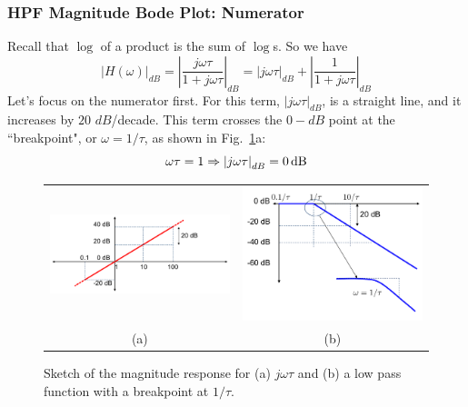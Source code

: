 \subsubsection{HPF Magnitude Bode Plot: Numerator}
Recall that $\log$ of a product is the sum of $\log$s.  So we have
    \begin{equation}
        {\left| {H(\omega )} \right|_{dB}} = {\left| {\frac{{j\omega \tau }}{{1 + j\omega \tau }}} \right|_{dB}} = {\left| {j\omega \tau } \right|_{dB}} + {\left| {\frac{1}{{1 + j\omega \tau }}} \right|_{dB}}
    \end{equation}
Let's focus on the numerator first.  For this term, $\left|j\omega \tau  \right|_{dB} $, is a straight line, and it increases by $20$ $dB$/decade.  This term crosses the $0-dB$ point at the ``breakpoint", or $\omega = 1/\tau$, as shown in Fig.~\ref{fig:hpfnumden}a:
    \begin{equation}
        \omega \tau  = 1 \Rightarrow {\left| {j\omega \tau } \right|_{dB}} = 0\,{\rm{dB}}
    \end{equation}
\begin{figure}[tb]
\centering
\begin{tabular}{cc}
\includegraphics[width=.55\columnwidth]{mod1_3_9_bode1} &
\includegraphics[width=.35\columnwidth]{mod1_3_10_bode2}\\
(a) & (b)\\
\end{tabular}
\caption{Sketch of the magnitude response for (a) $j\omega \tau$ and (b) a low pass function with a breakpoint at $1/\tau$.}
\label{fig:hpfnumden}
\end{figure}
